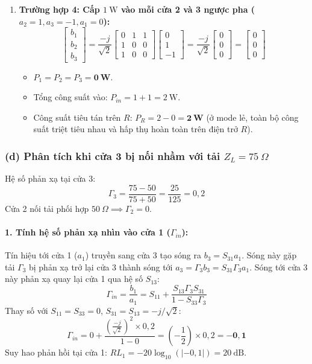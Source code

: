 \documentclass[12pt,a4paper]{article}
\begin{document}
\begin{enumerate}
    \item \textbf{Trường hợp 4: Cấp $1~\text{W}$ vào mỗi cửa 2 và 3 ngược pha ($a_2 = 1, a_3 = -1, a_1 = 0$):}
    \[
    \begin{bmatrix} b_1 \\ b_2 \\ b_3 \end{bmatrix} = \frac{-j}{\sqrt{2}} \begin{bmatrix} 0 & 1 & 1 \\ 1 & 0 & 0 \\ 1 & 0 & 0 \end{bmatrix} \begin{bmatrix} 0 \\ 1 \\ -1 \end{bmatrix} = \frac{-j}{\sqrt{2}} \begin{bmatrix} 0 \\ 0 \\ 0 \end{bmatrix} = \begin{bmatrix} 0 \\ 0 \\ 0 \end{bmatrix}
    \]
    \begin{itemize}
        \item $P_1 = P_2 = P_3 = \mathbf{0~\text{W}}$.
        \item Tổng công suất vào: $P_{in} = 1 + 1 = 2~\text{W}$.
        \item Công suất tiêu tán trên $R$: $P_R = 2 - 0 = \mathbf{2~\text{W}}$ (ở mode lẻ, toàn bộ công suất triệt tiêu nhau và hấp thụ hoàn toàn trên điện trở $R$).
    \end{itemize}
\end{enumerate}

\subsubsection{(d) Phân tích khi cửa 3 bị nối nhầm với tải $Z_L = 75~\Omega$}
Hệ số phản xạ tại cửa 3:
\[
\Gamma_3 = \frac{75 - 50}{75 + 50} = \frac{25}{125} = 0{,}2
\]
Cửa 2 nối tải phối hợp $50~\Omega \implies \Gamma_2 = 0$.
\paragraph{1. Tính hệ số phản xạ nhìn vào cửa 1 ($\Gamma_{in}$):}
Tín hiệu tới cửa 1 ($a_1$) truyền sang cửa 3 tạo sóng ra $b_3 = S_{31} a_1$. Sóng này gặp tải $\Gamma_3$ bị phản xạ trở lại cửa 3 thành sóng tới $a_3 = \Gamma_3 b_3 = S_{31} \Gamma_3 a_1$. Sóng tới cửa 3 này phản xạ quay lại cửa 1 qua hệ số $S_{13}$:
\[
\Gamma_{in} = \frac{b_1}{a_1} = S_{11} + \frac{S_{13} \Gamma_3 S_{31}}{1 - S_{33}\Gamma_3}
\]
Thay số với $S_{11} = S_{33} = 0$, $S_{31} = S_{13} = -j/\sqrt{2}$:
\[
\Gamma_{in} = 0 + \frac{\left( \frac{-j}{\sqrt{2}} \right)^2 \times 0{,}2}{1 - 0} = \left(-\frac{1}{2}\right) \times 0{,}2 = \mathbf{-0{,}1}
\]
Suy hao phản hồi tại cửa 1: $RL_1 = -20 \log_{10}(|-0{,}1|) = 20~\text{dB}$.
\end{document}
